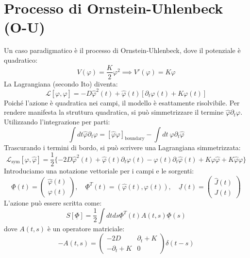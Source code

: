 \section{Processo di Ornstein-Uhlenbeck (O-U)}
Un caso paradigmatico è il processo di Ornstein-Uhlenbeck, dove il potenziale è quadratico:
\begin{equation}
V(\varphi)=\frac{K}{2}\varphi^{2} \implies V'(\varphi)=K\varphi
\end{equation}
La Lagrangiana (secondo Ito) diventa:
\begin{equation}
\mathcal{L}[\varphi,\hat{\varphi}]=-D\hat{\varphi}^{2}(t)+\hat{\varphi}(t)[\partial_{t}\varphi(t)+K\varphi(t)]
\end{equation}
Poiché l'azione è quadratica nei campi, il modello è esattamente risolvibile.
Per rendere manifesta la struttura quadratica, si può simmetrizzare il termine $\hat{\varphi}\partial_t\varphi$.
Utilizzando l'integrazione per parti:
\begin{equation*} 
\int dt\hat{\varphi}\partial_{t}\varphi = [\hat{\varphi}\varphi]_{\text{boundary}} - \int dt~\varphi\partial_{t}\hat{\varphi} 
\end{equation*}
Trascurando i termini di bordo, si può scrivere una Lagrangiana simmetrizzata:
\begin{equation}
\mathcal{L}_{\text{sym}}[\varphi,\hat{\varphi}]=\frac{1}{2}\{-2D\hat{\varphi}^{2}(t)+\hat{\varphi}(t)\partial_{t}\varphi(t)-\varphi(t)\partial_{t}\hat{\varphi}(t)+K\varphi\hat{\varphi}+K\hat{\varphi} \varphi\}
\end{equation}
Introduciamo una notazione vettoriale per i campi e le sorgenti:
\begin{equation}
\underline{\Phi}(t)=\begin{pmatrix}\hat{\varphi}(t)\\ \varphi(t)\end{pmatrix}, \quad \underline{\Phi}^{T}(t)=(\hat{\varphi}(t),\varphi(t)), \quad \underline{J}(t)=\begin{pmatrix}\hat{J}(t)\\ J(t)\end{pmatrix}
\end{equation}
L'azione può essere scritta come:
\begin{equation}
S[\underline{\Phi}]=\frac{1}{2}\int dt ds \underline{\Phi}^{T}(t) A(t,s) \underline{\Phi}(s)
\end{equation}
dove $A(t,s)$ è un operatore matriciale:
\begin{equation}
-A(t,s)=\begin{pmatrix}-2D & \partial_{t}+K\\ -\partial_{t}+K & 0\end{pmatrix}\delta(t-s)
\end{equation}
